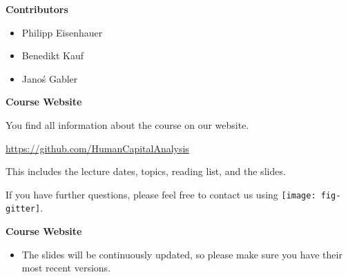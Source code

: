 \begin{frame}\textbf{Contributors}\vspace{0.3cm}

\begin{itemize}\setlength\itemsep{1em}
\item Philipp Eisenhauer
\item Benedikt Kauf
\item Jano\'{s} Gabler
\end{itemize}

\end{frame}
\begin{frame}
	\textbf{Course Website}\vspace{0.3cm}

You find all information about the course on our website.

\begin{center}
\url{https://github.com/HumanCapitalAnalysis}
\end{center}

This includes the lecture dates, topics, reading list, and the slides.\vspace{0.3cm}

If you have further questions, please feel free to contact us using
\texttt{[image: fig-gitter]}.

\end{frame}
\begin{frame}
	\textbf{Course Website}\vspace{0.3cm}

\begin{itemize}
\item The slides will be continuously updated, so please make sure you have their most recent versions.
\end{itemize}

\end{frame}
